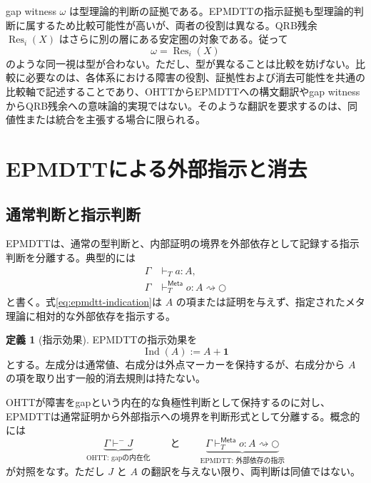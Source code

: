 \documentclass[a4paper,11pt]{ltjsarticle}
\theoremstyle{definition}
\newtheorem{definition}{定義}[section]
\theoremstyle{plain}
\newcommand{\Ind}{\operatorname{Ind}}
\newcommand{\Unit}{\mathbf 1}
\newcommand{\Meta}{\mathsf{Meta}}
\newcommand{\Res}{\operatorname{Res}}
\newcommand{\dfix}{\bigcirc}
\begin{document}
gap witness $\omega$ は型理論的判断の証拠である。EPMDTTの指示証拠も型理論的判断に属するため比較可能性が高いが、両者の役割は異なる。QRB残余 $\Res_i(X)$ はさらに別の層にある安定圏の対象である。従って
\begin{equation}
 \omega=\Res_i(X)
\end{equation}
のような同一視は型が合わない。ただし、型が異なることは比較を妨げない。比較に必要なのは、各体系における障害の役割、証拠性および消去可能性を共通の比較軸で記述することであり、OHTTからEPMDTTへの構文翻訳やgap witnessからQRB残余への意味論的実現ではない。そのような翻訳を要求するのは、同値性または統合を主張する場合に限られる。

\section{EPMDTTによる外部指示と消去}

\subsection{通常判断と指示判断}

EPMDTTは、通常の型判断と、内部証明の境界を外部依存として記録する指示判断を分離する\cite{ChibaEPMDTT2026}。典型的には
\begin{align}
 \Gamma&\vdash_T a:A,
 \label{eq:epmdtt-ordinary}\\
 \Gamma&\vdash_T^{\Meta}o:A\rightsquigarrow\dfix
 \label{eq:epmdtt-indication}
\end{align}
と書く。式\eqref{eq:epmdtt-indication}は $A$ の項または証明を与えず、指定されたメタ理論に相対的な外部依存を指示する。

\begin{definition}[指示効果]
EPMDTTの指示効果を
\begin{equation}
 \Ind(A):=A+\Unit
 \label{eq:indication-effect-inspection}
\end{equation}
とする。左成分は通常値、右成分は外点マーカーを保持するが、右成分から $A$ の項を取り出す一般的消去規則は持たない。
\end{definition}

OHTTが障害をgapという内在的な負極性判断として保持するのに対し、EPMDTTは通常証明から外部指示への境界を判断形式として分離する。概念的には
\begin{equation}
 \underbrace{\Gamma\vdash^-J}_{\text{OHTT: gapの内在化}}
 \qquad\text{と}\qquad
 \underbrace{\Gamma\vdash_T^{\Meta}o:A\rightsquigarrow\dfix}_{\text{EPMDTT: 外部依存の指示}}
 \label{eq:ohtt-epmdtt-contrast}
\end{equation}
が対照をなす。ただし $J$ と $A$ の翻訳を与えない限り、両判断は同値ではない。
\end{document}
